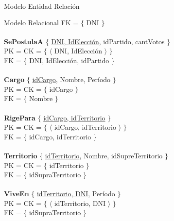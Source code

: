 \begin{section}{Modelo Entidad Relaci\'on}
\begin{subsection}{Modelo Relacional}
FK = $ \lbrace $ DNI $ \rbrace $\\
\\
\textbf{SePostulaA} $ \lbrace $ \underline{DNI, IdElecci\'on}, idPartido, cantVotos $ \rbrace $ \\
PK = CK = $ \lbrace $ $ \langle $ DNI, IdElecci\'on $ \rangle $ $ \rbrace $ \\
FK = $ \lbrace $ DNI, IdElecci\'on, idPartido $ \rbrace $\\
\\
\textbf{Cargo} $ \lbrace $ \underline{idCargo}, Nombre, Período $ \rbrace $ \\
PK = CK = $ \lbrace $ idCargo $ \rbrace $ \\
FK = $ \lbrace $ Nombre $ \rbrace $\\
\\
\textbf{RigePara} $ \lbrace $ \underline{idCargo, idTerritorio} $ \rbrace $ \\
PK = CK = $ \lbrace $ $ \langle $ idCargo, idTerritorio $ \rangle $ $ \rbrace $ \\
FK = $ \lbrace $ idCargo, idTerritorio $ \rbrace $\\
\\
\textbf{Territorio} $ \lbrace $ \underline{idTerritorio}, Nombre, idSupreTerritorio $ \rbrace $ \\
PK = CK = $ \lbrace $ idTerritorio $ \rbrace $ \\
FK = $ \lbrace $ idSupraTerritorio $ \rbrace $\\
\\
\textbf{ViveEn} $ \lbrace $ \underline{idTerritorio, DNI}, Per\'iodo $ \rbrace $ \\
PK = CK = $ \lbrace $ $ \langle $ idTerritorio, DNI $ \rangle $ $ \rbrace $ \\
FK = $ \lbrace $ idSupraTerritorio $ \rbrace $\\


\end{subsection}

\end{section}
